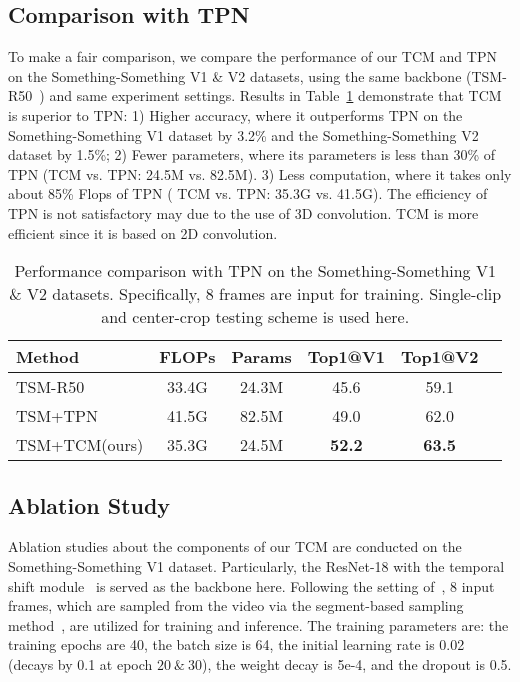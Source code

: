 \documentclass[journal]{IEEEtran}
\begin{document}
\subsection{Comparison with TPN}
To make a fair comparison, we compare the performance of our TCM and TPN~\cite{yang2020temporal} on the Something-Something V1 \& V2 datasets, using the same backbone (TSM-R50~\cite{lin2019tsm}) and same experiment settings. Results in Table~\ref{tab:tpn_tcm} demonstrate that TCM is superior to TPN: 1) Higher accuracy, where it outperforms TPN on the Something-Something V1 dataset by 3.2\% and the Something-Something V2 dataset by 1.5\%; 2) Fewer parameters, where its parameters is less than 30\% of TPN (TCM vs. TPN: 24.5M vs. 82.5M). 3) Less computation, where it takes only about 85\% Flops of TPN ( TCM vs. TPN: 35.3G vs. 41.5G). The efficiency of TPN is not satisfactory may due to the use of 3D convolution. TCM is more efficient since it is based on 2D convolution.

\begin{table}
\caption{Performance comparison with TPN on the Something-Something V1 \& V2 datasets. Specifically, 8 frames are input for training. Single-clip and
center-crop testing scheme is used here.}
\label{tab:tpn_tcm}
\centering
\begin{tabular}{|l|c|c|c|c|c}
\hline
Method                         & FLOPs      & Params & Top1@V1 &  Top1@V2 \\ \hline
TSM-R50~\cite{lin2019tsm}        & 33.4G   & 24.3M   & 45.6  & 59.1            \\ \hline
TSM+TPN~\cite{yang2020temporal}    & 41.5G   & 82.5M     & 49.0      & 62.0    \\ \hline
TSM+TCM(ours)    &     35.3G     &   24.5M    & \textbf{52.2}       & \textbf{63.5}      \\ \hline
\end{tabular}
\end{table}

\subsection{Ablation Study}
Ablation studies about the components of our TCM are conducted on the Something-Something V1 dataset. Particularly, the ResNet-18 with the temporal shift module~\cite{lin2019tsm} is served as the backbone here. Following the setting of~\cite{lin2019tsm}, 8 input frames, which are sampled from the video via the segment-based sampling method~\cite{wang2016temporal}, are utilized for training and inference. The training parameters are: the training epochs are 40, the batch size is 64, the initial learning rate is 0.02 (decays by 0.1 at epoch $20~\&~30$), the weight decay is 5e-4, and the dropout is 0.5.
\end{document}
